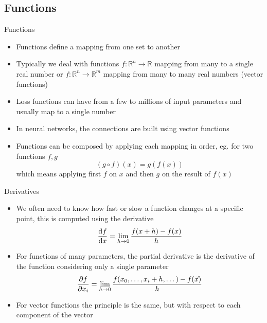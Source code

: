 \subsection{Functions}

  \begin{frame}{Functions}
    \begin{itemize}
      \item Functions define a mapping from one set to another
      \item Typically we deal with functions $f:\mathbb{R}^n \rightarrow \mathbb{R}$ mapping from many to a single real number or $f:\mathbb{R}^n \rightarrow \mathbb{R}^m$ mapping from many to many real numbers (vector functions)
      \item Loss functions can have from a few to millions of input parameters and usually map to a single number
      \item In neural networks, the connections are built using vector functions
      \item Functions can be composed by applying each mapping in order, eg. for two functions $f, g$
      \begin{equation*}
        (g\circ f)(x) = g(f(x))
      \end{equation*}
      which means applying first $f$ on $x$ and then $g$ on the result of $f(x)$
    \end{itemize}
  \end{frame}

  \begin{frame}{Derivatives}
    \begin{itemize}
      \item We often need to know how fast or slow a function changes at a specific point, this is computed using the derivative
      \begin{equation*}
        \frac{\mathrm{d}f}{\mathrm{d}x} = \lim\limits_{h\rightarrow 0} \frac{f(x+h) - f(x)}{h}
      \end{equation*}
      \item For functions of many parameters, the partial derivative is the derivative of the function considering only a single parameter
      \begin{equation*}
        \frac{\partial f}{\partial x_i} = \lim\limits_{h\rightarrow 0}
          \frac{f(x_0, \dots, x_i+h, \dots) - f(\vec{x})}{h}
      \end{equation*}
    \item For vector functions the principle is the same, but with respect to each component of the vector
    \end{itemize}
  \end{frame}

